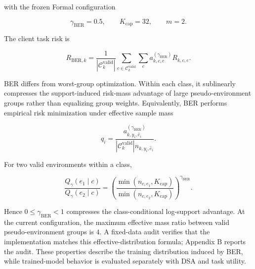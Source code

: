 with the frozen Formal configuration

\[
\gamma_{\mathrm{BER}}=0.5,\qquad K_{\mathrm{cap}}=32,\qquad m=2.
\]

The client task risk is

\[
R_{\mathrm{BER},k}
=
\frac1{|\mathcal C_k^{\mathrm{valid}}|}
\sum_{c\in\mathcal C_k^{\mathrm{valid}}}
\sum_e a^{(\gamma_{\mathrm{BER}})}_{k,c,e}R_{k,c,e}.
\]

BER differs from worst-group optimization. Within each class, it sublinearly compresses the support-induced risk-mass advantage of large pseudo-environment groups rather than equalizing group weights. Equivalently, BER performs empirical risk minimization under effective sample mass

\[
q_i=
\frac{a^{(\gamma_{\mathrm{BER}})}_{k,y_i,\hat e_i}}
{|\mathcal C_k^{\mathrm{valid}}|n_{k,y_i,\hat e_i}}.
\]

For two valid environments within a class,

\[
\frac{Q_\gamma(e_1\mid c)}{Q_\gamma(e_2\mid c)}
=
\left(
\frac{\min(n_{c,e_1},K_{\mathrm{cap}})}
{\min(n_{c,e_2},K_{\mathrm{cap}})}
\right)^{\gamma_{\mathrm{BER}}}.
\]

Hence \(0\le\gamma_{\mathrm{BER}}<1\) compresses the class-conditional log-support advantage. At the current configuration, the maximum effective mass ratio between valid pseudo-environment groups is \(4\). A fixed-data audit verifies that the implementation matches this effective-distribution formula; Appendix B reports the audit. These properties describe the training distribution induced by BER, while trained-model behavior is evaluated separately with DSA and task utility.
